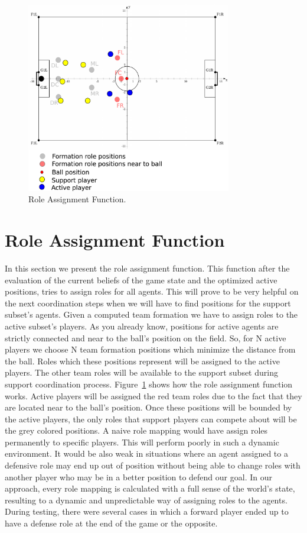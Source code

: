 \begin{figure}[t!]
\centering
  \includegraphics[width=0.8\textwidth]{Chapter4/figures/RoleAss.pdf}
  \caption{Role Assignment Function.} 
  \label{fig:RoleAss}
\end{figure}


\section{Role Assignment Function}
In this section we present the role assignment function. This function after the evaluation of the current beliefs of the game state and the optimized active positions, tries to assign roles for all agents. This will prove to be very helpful on the next coordination steps when we will have to find positions for the support subset's agents. Given a computed team formation we have to assign roles to the active subset's players. As you already know, positions for active agents are strictly connected and near to the ball's position on the field. So, for N active players we choose N team formation positions which minimize the distance from the ball. Roles which these positions represent will be assigned to the active players. The other team roles will be available to the support subset during support coordination process. Figure~\ref{fig:RoleAss} shows how the role assignment function works. Active players will be assigned the red team roles due to the fact that they are located near to the ball's position. Once these positions will be bounded by the active players, the only roles that support players can compete about will be the grey colored positions. A naive role mapping would have assign roles permanently to specific players. This will perform poorly in such a dynamic environment. It would be also weak in situations where an agent assigned to a defensive role may end up out of position without being able to change roles with another player who may be in a better position to defend our goal. In our approach, every role mapping is calculated with a full sense of the world's state, resulting to a dynamic and unpredictable way of assigning roles to the agents. During testing, there were several cases in which a forward player ended up to have a defense role at the end of the game or the opposite.


